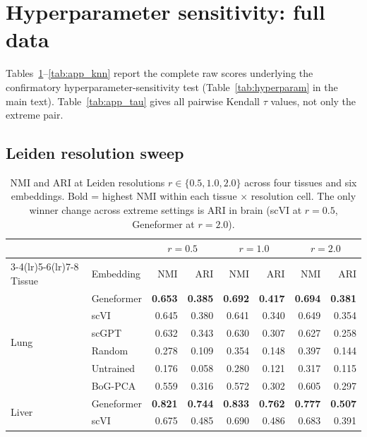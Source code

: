 \documentclass[10pt,letterpaper]{article}
\begin{document}
\section{Hyperparameter sensitivity: full data}
\label{app:hyperparam}

Tables~\ref{tab:app_leiden}--\ref{tab:app_knn} report the complete raw scores underlying the confirmatory hyperparameter-sensitivity test (Table~\ref{tab:hyperparam} in the main text). Table~\ref{tab:app_tau} gives all pairwise Kendall $\tau$ values, not only the extreme pair.

\subsection{Leiden resolution sweep}

\begin{table}[h!]
\centering
\caption{NMI and ARI at Leiden resolutions $r \in \{0.5, 1.0, 2.0\}$ across four tissues and six embeddings. Bold = highest NMI within each tissue $\times$ resolution cell. The only winner change across extreme settings is ARI in brain (scVI at $r=0.5$, Geneformer at $r=2.0$).}
\label{tab:app_leiden}
\scriptsize
\begin{tabular}{@{}ll rr rr rr@{}}
\toprule
 & & \multicolumn{2}{c}{$r = 0.5$} & \multicolumn{2}{c}{$r = 1.0$} & \multicolumn{2}{c}{$r = 2.0$} \\
\cmidrule(lr){3-4}\cmidrule(lr){5-6}\cmidrule(lr){7-8}
Tissue & Embedding & NMI & ARI & NMI & ARI & NMI & ARI \\
\midrule
\multirow{6}{*}{Lung}
 & Geneformer & \textbf{0.653} & \textbf{0.385} & \textbf{0.692} & \textbf{0.417} & \textbf{0.694} & \textbf{0.381} \\
 & scVI       & 0.645 & 0.380 & 0.641 & 0.340 & 0.649 & 0.354 \\
 & scGPT      & 0.632 & 0.343 & 0.630 & 0.307 & 0.627 & 0.258 \\
 & Random     & 0.278 & 0.109 & 0.354 & 0.148 & 0.397 & 0.144 \\
 & Untrained  & 0.176 & 0.058 & 0.280 & 0.121 & 0.317 & 0.115 \\
 & BoG-PCA    & 0.559 & 0.316 & 0.572 & 0.302 & 0.605 & 0.297 \\
\midrule
\multirow{6}{*}{Liver}
 & Geneformer & \textbf{0.821} & \textbf{0.744} & \textbf{0.833} & \textbf{0.762} & \textbf{0.777} & \textbf{0.507} \\
 & scVI       & 0.675 & 0.485 & 0.690 & 0.486 & 0.683 & 0.391 \\

\end{tabular}
\end{table}
\end{document}
